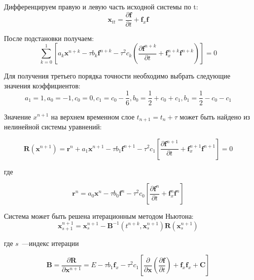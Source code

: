 Дифференцируем правую и левую часть исходной системы по t:
\begin{equation}
\mathbf{x}_{tt}=\frac{\partial \mathbf{f}}{\partial t}+\mathbf{f}_{x}\mathbf{f}
\end{equation}

После подстановки получаем:
\begin{equation}
\sum_{k=0}^{1}\left[a_{k}\mathbf{x}^{n+k}-\tau b_{k}\mathbf{f}^{n+k}-\tau^{2}c_{k}\left(\frac{\partial \mathbf{f}^{n+k}}{\partial t}+\mathbf{f}_{x}^{n+k}\mathbf{f}^{n+k}\right)\right]=0
\end{equation}

Для получения третьего порядка точности необходимо выбрать следующие значения коэффициентов:
\begin{equation}
a_{1}=1, a_{0}=-1, c_{0}=0, c_{1}=c_{0}-\frac{1}{6},
b_{0}=\frac{1}{2}+c_{0}+c_{1}, b_{1}=\frac{1}{2}-c_{0}-c_{1}
\end{equation}

Значение \( x^{n+1}\) на верхнем временном слое $t_{n+1} = t_n+\tau$ может быть найдено из нелинейной системы уравнений:

\begin{equation}
\mathbf{R}\left(\mathbf{x}^{n+1}\right)=\mathbf{r}^{n}+a_{1}\mathbf{x}^{n+1}-\tau b_{1}\mathbf{f}^{n+1}-\tau^{2}c_{1}\left[\frac{\partial\mathbf{f}^{n+1}}{\partial t}+\mathbf{f}_{x}^{n+1}\mathbf{f}^{n+1}\right]=0
\end{equation}

где

\begin{equation}
\mathbf{r}^{n}=a_{0}\mathbf{x}^{n}-\tau b_{0}\mathbf{f}^{n}-\tau^{2}c_{0}\left[\frac{\partial\mathbf{f}^{n}}{\partial t}+\mathbf{f}_{x}^{n}\mathbf{f}^{n}\right]
\end{equation}

Система может быть решена итерационным методом Ньютона:
\begin{equation}\label{eq:iter_Obreshkov}
\mathbf{x}_{s+1}^{n+1}=\mathbf{x}_{s}^{n+1}-\mathbf{B}^{-1}\left(t^{n+k}, \mathbf{x}_{s}^{n+1}\right)\mathbf{R}\left(\mathbf{x}_{s}^{n+1}\right)
\end{equation}

где $s$~---индекс итерации

\begin{equation}
\mathbf{B}=\frac{\partial\mathbf{R}}{\partial\mathbf{x}^{n+1}}=E-\tau b_{1}\mathbf{f}_{x}-\tau^{2}c_{1}\left[\frac{\partial}{\partial \mathbf{x}}\left(\frac{\partial\mathbf{f}}{\partial t}\right)+\mathbf{f}_{x}\mathbf{f}_{x}+\mathbf{C}\right]
\end{equation}

